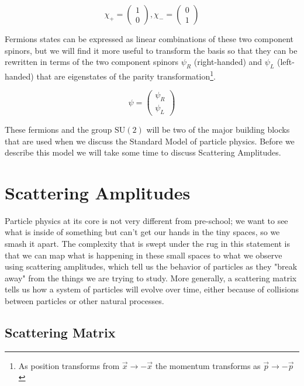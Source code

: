 \begin{equation}
\label{eq:spinors}
\chi_{+} = \begin{pmatrix} 1 \\ 0 \end{pmatrix}, \chi_{-} = \begin{pmatrix} 0\\1\end{pmatrix}
\end{equation}

Fermions states can be expressed as linear combinations of these two component spinors, but we will find it more useful to transform the basis so that they can be rewritten in terms of the two component spinors $\psi_{R}$ (right-handed) and $\psi_{L}$ (left-handed) that are eigenstates of the parity transformation\footnote{As position transforms from $\vec{x} \to -\vec{x}$ the momentum transforms as $\vec{p} \to -\vec{p}$}.

\begin{equation}
\label{eq:TwoRandL}
\psi = \begin{pmatrix} \psi_{R} \\ \psi_{L} \end{pmatrix}
\end{equation}

These fermions and the group $\mathrm{SU}(2)$ will be two of the major building blocks that are used when we discuss the Standard Model of particle physics. Before we describe this model we will take some time to discuss Scattering Amplitudes.

\section{Scattering Amplitudes}
\label{sec:Scattering}

Particle physics at its core is not very different from pre-school; we want to see what is inside of something but can't get our hands in the tiny spaces, so we smash it apart. The complexity that is swept under the rug in this statement is that we can map what is happening in these small spaces to what we observe using scattering amplitudes, which tell us the behavior of particles as they "break away" from the things we are trying to study. More generally, a scattering matrix tells us how a system of particles will evolve over time, either because of collisions between particles or other natural processes.

\subsection{Scattering Matrix}
\label{sec:Smatrix}

